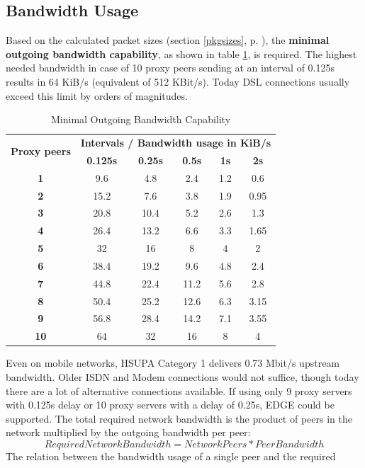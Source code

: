 \subsection{Bandwidth Usage}
\label{bwusagetheory}
Based on the calculated packet sizes (section \ref{pkgsizes}, p. \pageref{pkgsizes}), 
the \textbf{minimal outgoing bandwidth capability}, as shown in table \ref{bandwidth},
is required.
The highest needed bandwidth
in case of 10 proxy peers sending at an interval of 0.125s results in 64 KiB/s
(equivalent of 512 KBit/s).
Today DSL connections usually exceed this limit by orders of magnitudes.
\begin{longtable}{|c|c|c|c|c|c|}
\caption{Minimal Outgoing Bandwidth Capability}
\label{bandwidth}\\
\hline
\multirow{2}{*}{\textbf{Proxy peers}} & \multicolumn{5}{|l|}{\textbf{Intervals / Bandwidth usage in KiB/s}} \\
& \textbf{0.125s} & \textbf{0.25s} & \textbf{0.5s} & \textbf{1s} & \textbf{2s}\\
\hline
\textbf{1} & 9.6 & 4.8 & 2.4 & 1.2 & 0.6\\
\hline
\textbf{2} & 15.2 & 7.6 & 3.8 & 1.9 & 0.95\\
\hline
\textbf{3} & 20.8 & 10.4 & 5.2 & 2.6 & 1.3\\
\hline
\textbf{4} & 26.4 & 13.2 & 6.6 & 3.3 & 1.65\\
\hline
\textbf{5} & 32 & 16 & 8 & 4 & 2\\
\hline
\textbf{6} & 38.4 & 19.2 & 9.6 & 4.8 & 2.4\\
\hline
\textbf{7} & 44.8 & 22.4 & 11.2 & 5.6 & 2.8\\
\hline
\textbf{8} & 50.4 & 25.2 & 12.6 & 6.3 & 3.15\\
\hline
\textbf{9} & 56.8 & 28.4 & 14.2 & 7.1 & 3.55\\
\hline
\textbf{10} & 64 & 32 & 16 & 8 & 4\\
\hline
\end{longtable}
Even on mobile networks, HSUPA Category 1 delivers 0.73 Mbit/s upstream bandwidth.
Older ISDN and Modem connections would not suffice,
though today there are a lot of alternative connections available.\cite{wiki:bitrates}
If using only 9 proxy servers with 0.125s delay or
10 proxy servers with a delay of 0.25s, EDGE could be supported.
The total required network bandwidth is the product of peers in the
network multiplied by the outgoing bandwidth per peer:
$$Required Network Bandwidth = Network Peers * Peer Bandwidth$$
The relation between the bandwidth usage of a single peer and the required
